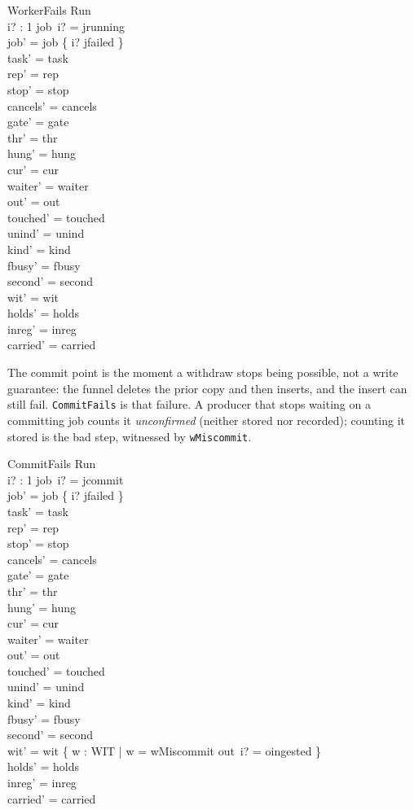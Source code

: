\documentclass[a4paper,10pt,fleqn]{article}
\newcommand{\field}[1]{\texttt{#1}}
\begin{document}
\begin{schema}{WorkerFails}
\Delta Run \\ i? : 1 
\where
job~i? = jrunning \\
job' = job \oplus \{ i? \mapsto jfailed \} \\
task' = task \\
rep' = rep \\
stop' = stop \\
cancels' = cancels \\
gate' = gate \\
thr' = thr \\
hung' = hung \\
cur' = cur \\
waiter' = waiter \\
out' = out \\
touched' = touched \\
unind' = unind \\
kind' = kind \\
fbusy' = fbusy \\
second' = second \\
wit' = wit \\
holds' = holds \\
inreg' = inreg \\
carried' = carried
\end{schema}

The commit point is the moment a withdraw stops being possible, not a write
guarantee: the funnel deletes the prior copy and then inserts, and the insert
can still fail. \field{CommitFails} is that failure. A producer that stops
waiting on a committing job counts it \emph{unconfirmed} (neither stored nor
recorded); counting it stored is the bad step, witnessed by \field{wMiscommit}.

\begin{schema}{CommitFails}
\Delta Run \\ i? : 1 
\where
job~i? = jcommit \\
job' = job \oplus \{ i? \mapsto jfailed \} \\
task' = task \\
rep' = rep \\
stop' = stop \\
cancels' = cancels \\
gate' = gate \\
thr' = thr \\
hung' = hung \\
cur' = cur \\
waiter' = waiter \\
out' = out \\
touched' = touched \\
unind' = unind \\
kind' = kind \\
fbusy' = fbusy \\
second' = second \\
wit' = wit \cup \{ w : WIT | w = wMiscommit \land out~i? = oingested \} \\
holds' = holds \\
inreg' = inreg \\
carried' = carried
\end{schema}
\end{document}
